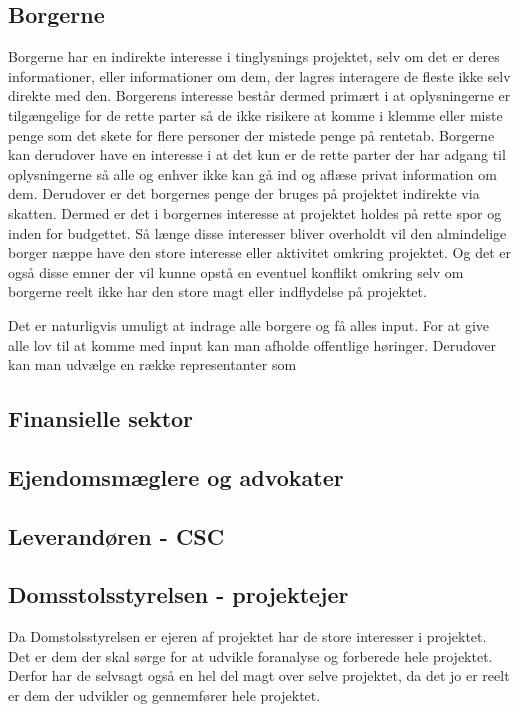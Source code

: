 \documentclass[10pt,a4paper,danish]{article}
\begin{document}
\subsection{Borgerne}
Borgerne har en indirekte interesse i tinglysnings projektet, selv om det er
deres informationer, eller informationer om dem, der lagres interagere de fleste ikke
selv direkte med den. Borgerens interesse består dermed primært i at
oplysningerne er tilgængelige for de rette parter så de ikke risikere at komme i
klemme eller miste penge som det skete for flere personer der mistede penge på
rentetab. Borgerne kan derudover have en interesse i at det kun er de rette
parter der har adgang til oplysningerne så alle og enhver ikke kan gå ind og
aflæse privat information om dem.
Derudover er det borgernes penge der bruges på projektet indirekte via skatten.
Dermed er det i borgernes interesse at projektet holdes på rette spor og inden
for budgettet.
Så længe disse interesser bliver overholdt vil den almindelige borger næppe
have den store interesse eller aktivitet omkring projektet.
Og det er også disse emner der vil kunne opstå en eventuel konflikt omkring selv
om borgerne reelt ikke har den store magt eller indflydelse på projektet.

Det er naturligvis umuligt at indrage alle borgere og få alles input.
For at give alle lov til at komme med input kan man afholde offentlige
høringer. Derudover kan man udvælge en række representanter som

\subsection{Finansielle sektor}


\subsection{Ejendomsmæglere og advokater}


\subsection{Leverandøren - CSC}


\subsection{Domsstolsstyrelsen - projektejer}
Da Domstolsstyrelsen er ejeren af projektet har de store interesser i projektet. Det er dem der skal sørge for at udvikle foranalyse og forberede hele projektet. Derfor har de selvsagt også en hel del magt over selve projektet, da det jo er reelt er dem der udvikler og gennemfører hele projektet.
\end{document}
